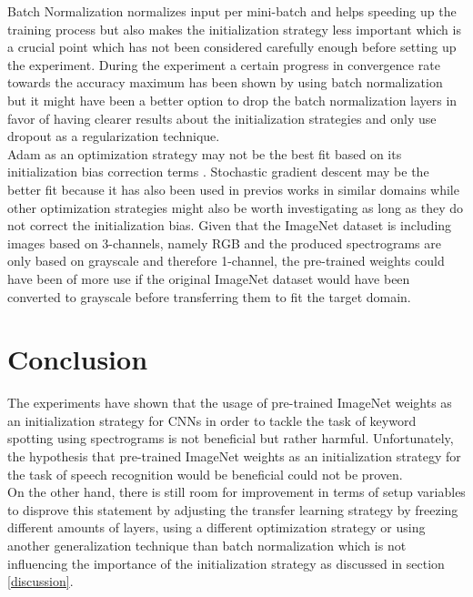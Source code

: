 \documentclass{article}
\theoremstyle{definition}
\theoremstyle{remark}
\begin{document}
Batch Normalization normalizes input per mini-batch and helps speeding up the training process but also makes the initialization strategy less important \cite{ioffe2015batch} which is a crucial point which has not been considered carefully enough before setting up the experiment. During the experiment a certain progress in convergence rate towards the accuracy maximum has been shown by using batch normalization but it might have been a better option to drop the batch normalization layers in favor of having clearer results about the initialization strategies and only use dropout as a regularization technique.\\
Adam as an optimization strategy may not be the best fit based on its initialization bias correction terms \cite{kingma2014adam}. Stochastic gradient descent may be the better fit because it has also been used in previos works in similar domains \cite{gouda2018speech} while other optimization strategies might also be worth investigating as long as they do not correct the initialization bias.
Given that the ImageNet dataset is including images based on 3-channels, namely RGB and the produced spectrograms are only based on grayscale and therefore 1-channel, the pre-trained weights could have been of more use if the original ImageNet dataset would have been converted to grayscale before transferring them to fit the target domain.
\\


\section{Conclusion}

The experiments have shown that the usage of pre-trained ImageNet weights as an initialization strategy for CNNs in order to tackle the task of keyword spotting using spectrograms is not beneficial but rather harmful. Unfortunately, the hypothesis that pre-trained ImageNet weights as an initialization strategy for the task of speech recognition would be beneficial could not be proven.\\

On the other hand, there is still room for improvement in terms of setup variables to disprove this statement by adjusting the transfer learning strategy by freezing different amounts of layers, using a different optimization strategy or using another generalization technique than batch normalization which is not influencing the importance of the initialization strategy as discussed in section \ref{discussion}.
\end{document}
